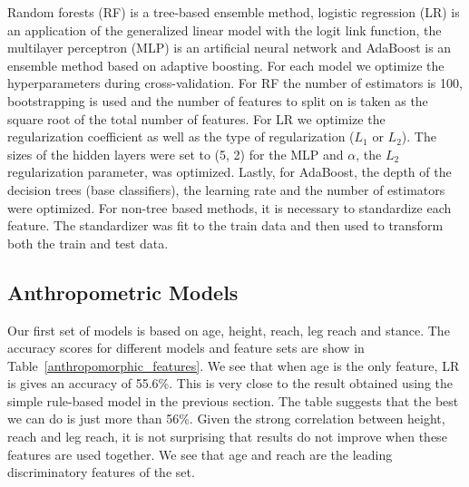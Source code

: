 Random forests (RF) is a tree-based ensemble method,
logistic regression (LR) is an application of the generalized
linear model with the logit link function, the multilayer perceptron (MLP)
is an artificial neural network and AdaBoost is
an ensemble method based on adaptive boosting.
For each model we optimize the hyperparameters
during cross-validation. For RF the
number of estimators is 100, bootstrapping is used
and the number of features to split on is taken
as the square root of the total number of features.
For LR we optimize the regularization coefficient
as well as the type of regularization ($L_1$ or $L_2$).
The sizes of the hidden layers were set to (5, 2) for
the MLP and $\alpha$, the $L_2$ regularization parameter, was optimized.
Lastly, for AdaBoost, the depth of the decision trees
(base classifiers), the learning rate and the number
of estimators were optimized.
For non-tree based methods, it is necessary to standardize
each feature. The standardizer was fit to the train data
and then used to transform both the train and test data.

\subsection*{Anthropometric Models}

Our first set of models is based on age, height,
reach, leg reach and stance. The accuracy scores
for different models and feature sets are show
in Table~\ref{anthropomorphic_features}.
We see that when age is the only feature, LR is gives
an accuracy of 55.6\%. This is very close to the result obtained using the simple
rule-based model in the previous section. The table
suggests that the best we can do is just more than
56\%. Given the strong correlation between height, reach
and leg reach, it is not surprising that results do not
improve when these features are used together. We see that
age and reach are the leading discriminatory features of the set.


